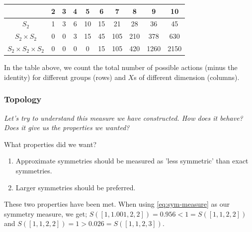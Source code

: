 \begin{changemargin}{-3cm}{-3cm}
  \begin{center}
    \begin{tabular}{ c || c | c | c | c | c | c | c | c | c }
											        & 2 & 3 & 4 & 5  & 6   & 7   & 8   & 9 & 10 \\ \hline \hline
											  $S_2$ & 1 & 3 & 6 & 10 & 15  & 21  & 28  & 36   & 45\\ \hline
					   $S_2 \times S_2$ & 0 & 0 & 3 & 15 & 45  & 105 & 210 & 378  & 630 \\ \hline
	$S_2 \times S_2 \times S_2$ & 0 & 0 & 0 & 0  & 15  & 105 & 420 & 1260 & 2150 \\
    \end{tabular}
  \end{center}
\end{changemargin}

In the table above, we count the total number of possible actions (minus the identity) for
different groups (rows) and $X$s of different dimension (columns).


\subsubsection{Topology}

\begin{displayquote}
\textsl{Let's try to understand this measure we have constructed. How does it behave?
Does it give us the properties we wanted?}
\end{displayquote}

What properties did we want?

\begin{enumerate}
\tightlist
	\item Approximate symmetries should be measured as 'less symmetric' than exact symmetries.
	\item Larger symmetries should be preferred.
\end{enumerate}

These two properties have been met. When using \ref{eq:sym-measure} as our symmetry measure, we get;
$S([1,1.001,2,2]) = 0.956 < 1 = S([1,1,2,2])$ and $S([1,1,2,2]) = 1  >  0.026 = S([1,1,2,3])$.

